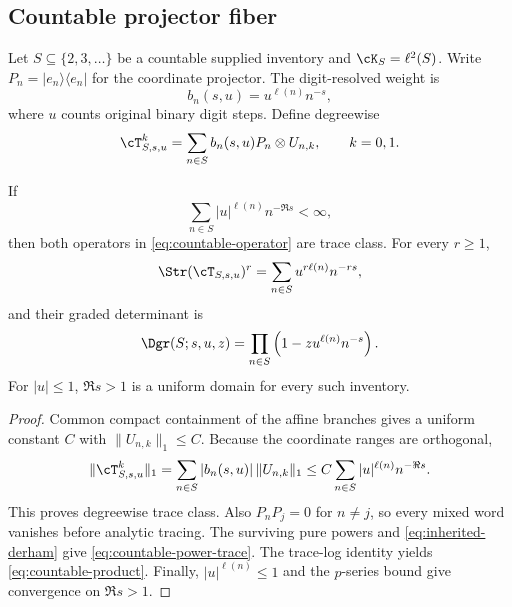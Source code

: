 \subsection{Countable projector fiber}

Let \(S\subseteq\{2,3,\ldots\}\) be a countable supplied inventory and
\(\cK_S=\ell^2(S)\).  Write \(P_n=|e_n\rangle\langle e_n|\) for the coordinate
projector.  The digit-resolved weight is
\begin{equation}
 b_n(s,u)=u^{\ell(n)}n^{-s},
 \label{eq:digit-weight}
\end{equation}
where \(u\) counts original binary digit steps.  Define degreewise
\begin{equation}
 \cT^k_{S,s,u}
 =\sum_{n\in S}b_n(s,u)P_n\otimes U_{n,k},
 \qquad k=0,1.
 \label{eq:countable-operator}
\end{equation}

\begin{theorem}
\label{thm:countable-selector}
If
\begin{equation}
 \sum_{n\in S}|u|^{\ell(n)}n^{-\Re s}<\infty,
 \label{eq:l1-domain}
\end{equation}
then both operators in \eqref{eq:countable-operator} are trace class.  For
every \(r\ge1\),
\begin{equation}
 \Str(\cT_{S,s,u})^r
 =\sum_{n\in S}u^{r\ell(n)}n^{-rs},
 \label{eq:countable-power-trace}
\end{equation}
and their graded determinant is
\begin{equation}
 \Dgr(S;s,u,z)=
 \prod_{n\in S}\left(1-zu^{\ell(n)}n^{-s}\right).
 \label{eq:countable-product}
\end{equation}
For \(|u|\le1\), \(\Re s>1\) is a uniform domain for every such inventory.
\end{theorem}

\begin{proof}
Common compact containment of the affine branches gives a uniform constant
\(C\) with \(\|U_{n,k}\|_1\le C\).  Because the coordinate ranges are
orthogonal,
\[
 \|\cT^k_{S,s,u}\|_1
 =\sum_{n\in S}|b_n(s,u)|\,\|U_{n,k}\|_1
 \le C\sum_{n\in S}|u|^{\ell(n)}n^{-\Re s}.
\]
This proves degreewise trace class.  Also \(P_nP_j=0\) for \(n\ne j\), so every
mixed word vanishes before analytic tracing.  The surviving pure powers and
\eqref{eq:inherited-derham} give \eqref{eq:countable-power-trace}.  The
trace-log identity yields \eqref{eq:countable-product}.  Finally,
\(|u|^{\ell(n)}\le1\) and the \(p\)-series bound give convergence on
\(\Re s>1\).
\end{proof}

